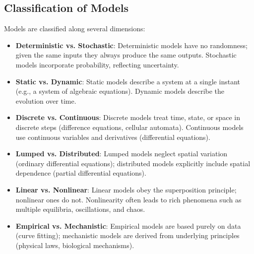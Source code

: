 \documentclass[12pt,a4paper]{book}
\begin{document}
\subsection*{Classification of Models}
Models are classified along several dimensions:
\begin{itemize}
    \item \textbf{Deterministic vs. Stochastic}: Deterministic models have no randomness; given the same inputs they always produce the same outputs. Stochastic models incorporate probability, reflecting uncertainty.
    \item \textbf{Static vs. Dynamic}: Static models describe a system at a single instant (e.g., a system of algebraic equations). Dynamic models describe the evolution over time.
    \item \textbf{Discrete vs. Continuous}: Discrete models treat time, state, or space in discrete steps (difference equations, cellular automata). Continuous models use continuous variables and derivatives (differential equations).
    \item \textbf{Lumped vs. Distributed}: Lumped models neglect spatial variation (ordinary differential equations); distributed models explicitly include spatial dependence (partial differential equations).
    \item \textbf{Linear vs. Nonlinear}: Linear models obey the superposition principle; nonlinear ones do not. Nonlinearity often leads to rich phenomena such as multiple equilibria, oscillations, and chaos.
    \item \textbf{Empirical vs. Mechanistic}: Empirical models are based purely on data (curve fitting); mechanistic models are derived from underlying principles (physical laws, biological mechanisms).
\end{itemize}
\end{document}
